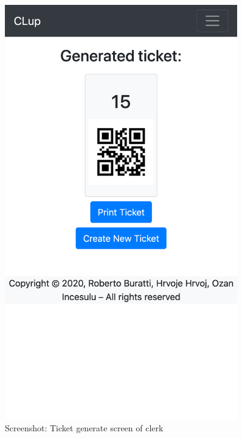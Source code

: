 \begin{figure}[H]
\begin{minipage}{0.45\textwidth}
        \includegraphics[width=0.9\textwidth]{Images/Screenshots/ticketGenerate.png} %
        \caption{Screenshot: Ticket generate screen of clerk}
    \end{minipage}
\end{figure}

